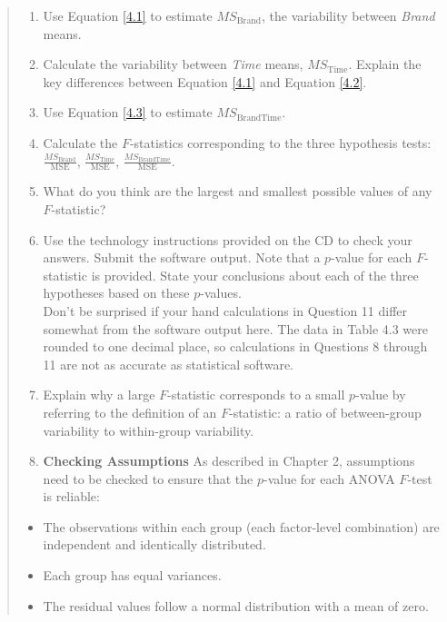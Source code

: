 \documentclass[
]{book}
\providecommand{\tightlist}{%
  \setlength{\itemsep}{0pt}\setlength{\parskip}{0pt}}
\begin{document}
\begin{quote}
\begin{enumerate}
\def\labelenumi{\arabic{enumi}.}
\setcounter{enumi}{7}
\tightlist
\item
  Use Equation \ref{4.1} to estimate \(MS_{\text{Brand}}\), the variability between \emph{Brand} means.\\
\item
  Calculate the variability between \emph{Time} means, \(MS_{\text{Time}}\). Explain the key differences between Equation \ref{4.1} and Equation \ref{4.2}.\\
\item
  Use Equation \ref{4.3} to estimate \(MS_{\text{BrandTime}}\).\\
\item
  Calculate the \(F\)-statistics corresponding to the three hypothesis tests: \(\frac{MS_{\text{Brand}}}{\text{MSE}}\), \(\frac{MS_{\text{Time}}}{\text{MSE}}\), \(\frac{MS_{\text{BrandTime}}}{\text{MSE}}\).\\
\item
  What do you think are the largest and smallest possible values of any \(F\)-statistic?\\
\item
  Use the technology instructions provided on the CD to check your answers. Submit the software output. Note that a \(p\)-value for each \(F\)-statistic is provided. State your conclusions about each of the three hypotheses based on these \(p\)-values.\\
  Don't be surprised if your hand calculations in Question 11 differ somewhat from the software output here. The data in Table 4.3 were rounded to one decimal place, so calculations in Questions 8 through 11 are not as accurate as statistical software.\\
\item
  Explain why a large \(F\)-statistic corresponds to a small \(p\)-value by referring to the definition of an \(F\)-statistic: a ratio of between-group variability to within-group variability.\\
\item
  \textbf{Checking Assumptions} As described in Chapter 2, assumptions need to be checked to ensure that the \(p\)-value for each ANOVA \(F\)-test is reliable:
\end{enumerate}

\begin{itemize}
\tightlist
\item
  The observations within each group (each factor-level combination) are independent and identically distributed.
\item
  Each group has equal variances.
\item
  The residual values follow a normal distribution with a mean of zero.
\end{itemize}


\end{quote}
\end{document}
